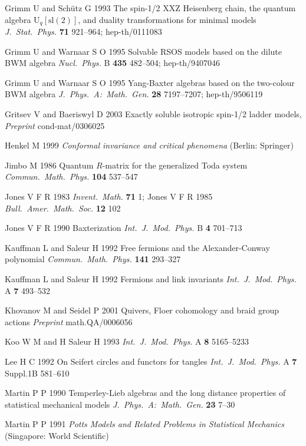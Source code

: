 \documentclass[12pt]{iopart}
\begin{document}
Grimm U and Sch\"{u}tz G 1993 
The spin-1/2 XXZ Heisenberg chain, the quantum algebra 
$\mbox{U}_q[\mbox{sl}(2)]$, and duality transformations 
for minimal models 
{\it J.\ Stat.\ Phys.}\/ {\bf 71} 921--964;
hep-th/0111083

Grimm U and Warnaar S O 1995
Solvable RSOS models based on the dilute BWM algebra
{\it Nucl.\ Phys.}\/ B {\bf 435} 482--504;
hep-th/9407046

Grimm U and Warnaar S O 1995
Yang-Baxter algebras based on the two-colour BWM algebra
{\it J.\ Phys.\ A:\  Math.\ Gen.}\/ {\bf 28} 7197--7207;
hep-th/9506119

Gritsev V and Baeriswyl D 2003
Exactly soluble isotropic spin-1/2 ladder models,
{\it Preprint}\/ cond-mat/0306025

Henkel M 1999
{\it Conformal invariance and critical phenomena}\/ 
(Berlin: Springer)

Jimbo M 1986
Quantum $R$-matrix for the generalized Toda system
{\it Commun.\ Math.\ Phys.}\/ {\bf 104} 537--547

Jones V F R 1983 
{\it Invent.\ Math.}\/ {\bf 71} 1;
Jones V F R 1985 
{\it Bull.\ Amer.\ Math.\ Soc.}\/ {\bf 12} 102

Jones V F R 1990
Baxterization
{\it Int.\ J.\ Mod.\ Phys.}\/ B {\bf 4} 701--713

Kauffman L and Saleur H 1992
Free fermions and the Alexander-Conway polynomial
{\it Commun.\ Math.\ Phys.}\/ {\bf 141} 293--327

Kauffman L and Saleur H 1992
Fermions and link invariants
{\it Int.\ J.\ Mod.\ Phys.}\/ A {\bf 7} 493--532

Khovanov M and Seidel P 2001
Quivers, Floer cohomology and braid group actions
{\it Preprint}\/ math.QA/0006056

Koo W M and H Saleur H 1993
{\it Int.\ J.\ Mod.\ Phys.}\/ A {\bf 8} 5165--5233

Lee H C 1992 
On Seifert circles and functors for tangles
{\it Int.\ J.\ Mod.\ Phys.}\/ A {\bf 7} Suppl.1B 581--610

Martin P P 1990
Temperley-Lieb algebras and the long distance properties of
statistical mechanical models 
{\it J.\ Phys.\ A:\  Math.\ Gen.}\/ {\bf 23} 7--30

Martin P P 1991
{\em Potts Models and Related Problems in Statistical Mechanics}\/
(Singapore: World Scientific)
\end{document}
